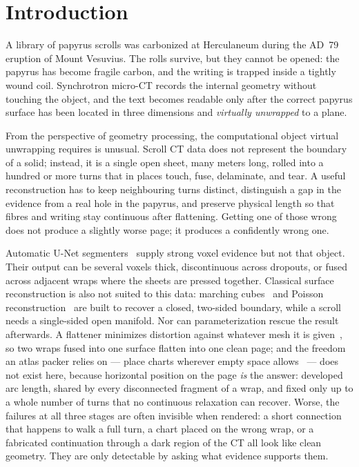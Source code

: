 \section{Introduction}

A library of papyrus scrolls was carbonized at Herculaneum during the AD~79 eruption of Mount Vesuvius. The rolls survive, but they cannot be opened: the papyrus has become fragile carbon, and the writing is trapped inside a tightly wound coil. Synchrotron micro-CT records the internal geometry without touching the object, and the text becomes readable only after the correct papyrus surface has been located in three dimensions and \emph{virtually unwrapped} to a plane.

From the perspective of geometry processing, the computational object virtual unwrapping requires is unusual. Scroll CT data does not represent the boundary of a solid; instead, it is a single open sheet, many meters long, rolled into a hundred or more turns that in places touch, fuse, delaminate, and tear. A useful reconstruction has to keep neighbouring turns distinct, distinguish a gap in the evidence from a real hole in the papyrus, and preserve physical length so that fibres and writing stay continuous after flattening. Getting one of those wrong does not produce a slightly worse page; it produces a confidently wrong one.

Automatic U-Net segmenters~\cite{ronneberger2015u} supply strong voxel evidence but not that object. Their output can be several voxels thick, discontinuous across dropouts, or fused across adjacent wraps where the sheets are pressed together. Classical surface reconstruction is also not suited to this data: marching cubes~\cite{lorensen1998marching} and Poisson reconstruction~\cite{kazhdan2006poisson} are built to recover a closed, two-sided boundary, while a scroll needs a single-sided open manifold. Nor can parameterization rescue the result afterwards. A flattener minimizes distortion against whatever mesh it is given~\cite{sheffer2005abf++}, so two wraps fused into one surface flatten into one clean page; and the freedom an atlas packer relies on --- place charts wherever empty space allows~\cite{limper2018box} --- does not exist here, because horizontal position on the page \emph{is} the answer: developed arc length, shared by every disconnected fragment of a wrap, and fixed only up to a whole number of turns that no continuous relaxation can recover. Worse, the failures at all three stages are often invisible when rendered: a short connection that happens to walk a full turn, a chart placed on the wrong wrap, or a fabricated continuation through a dark region of the CT all look like clean geometry. They are only detectable by asking what evidence supports them.

